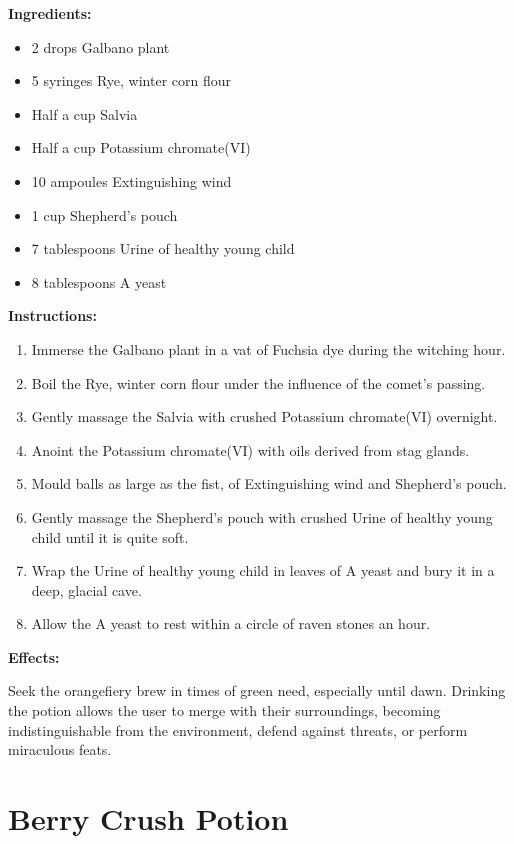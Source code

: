 \documentclass{article}
\begin{document}
\textbf{Ingredients:}

\begin{itemize}
  \item 2 drops Galbano plant
  \item 5 syringes Rye, winter corn flour
  \item Half a cup Salvia
  \item Half a cup Potassium chromate(VI)
  \item 10 ampoules Extinguishing wind
  \item 1 cup Shepherd's pouch
  \item 7 tablespoons Urine of healthy young child
  \item 8 tablespoons A yeast
\end{itemize}

\textbf{Instructions:}

\begin{enumerate}
  \item Immerse the Galbano plant in a vat of Fuchsia dye during the witching hour.
  \item Boil the Rye, winter corn flour under the influence of the comet’s passing.
  \item Gently massage the Salvia with crushed Potassium chromate(VI) overnight.
  \item Anoint the Potassium chromate(VI) with oils derived from stag glands.
  \item Mould balls as large as the fist, of Extinguishing wind and Shepherd's pouch.
  \item Gently massage the Shepherd's pouch with crushed Urine of healthy young child until it is quite soft.
  \item Wrap the Urine of healthy young child in leaves of A yeast and bury it in a deep, glacial cave.
  \item Allow the A yeast to rest within a circle of raven stones an hour.
\end{enumerate}

\textbf{Effects:}

Seek the orangefiery brew in times of green need, especially until dawn. Drinking the potion allows the user to merge with their surroundings, becoming indistinguishable from the environment, defend against threats, or perform miraculous feats.

\newpage
\section*{Berry Crush Potion}
\end{document}
